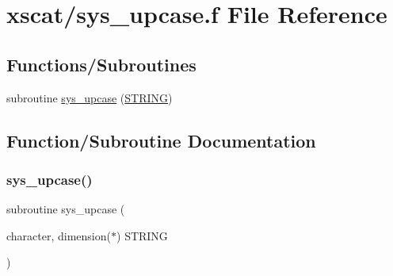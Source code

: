 \hypertarget{sys__upcase_8f}{}\section{xscat/sys\+\_\+upcase.f File Reference}
\label{sys__upcase_8f}
\subsection*{Functions/\+Subroutines}
\begin{DoxyCompactItemize}
\item 
subroutine \hyperlink{sys__upcase_8f_a708487a950b7907a379781eca45cbafe}{sys\+\_\+upcase} (\hyperlink{eval__tab_8h_a0f4d394a3ab4e09bff60f714c66dc5ee}{S\+T\+R\+I\+NG})
\end{DoxyCompactItemize}


\subsection{Function/\+Subroutine Documentation}
\mbox{\label{sys__upcase_8f_a708487a950b7907a379781eca45cbafe}} 
\subsubsection{\texorpdfstring{sys\+\_\+upcase()}{sys\_upcase()}}
{\footnotesize\ttfamily subroutine sys\+\_\+upcase (\begin{DoxyParamCaption}\item[{character, dimension($\ast$)}]{S\+T\+R\+I\+NG }\end{DoxyParamCaption})}


